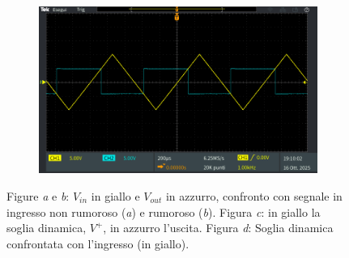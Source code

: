 \documentclass[a4paper,12pt]{article}
\begin{document}
\begin{figure}[h]
\begin{subfigure}{0.49\linewidth}
		\caption{}
	\end{subfigure}
	\begin{subfigure}{0.49\linewidth}
		\includegraphics[width = \linewidth]{immagini/schmitt/schmitt_vin_v+.png}
		\caption{}
	\end{subfigure}
	\caption{Figure \textit{a} e \textit{b}: $V_{in}$ in giallo e $V_{out}$ in azzurro, confronto con segnale in ingresso non rumoroso (\textit{a}) e rumoroso (\textit{b}).
		Figura \textit{c}: in giallo la soglia dinamica, $V^+$, in azzurro l'uscita.
		Figura \textit{d}: Soglia dinamica confrontata con l'ingresso (in giallo).}
	\label{fig:schmitt_oscilloscopio}
\end{figure}

\FloatBarrier
\end{document}
